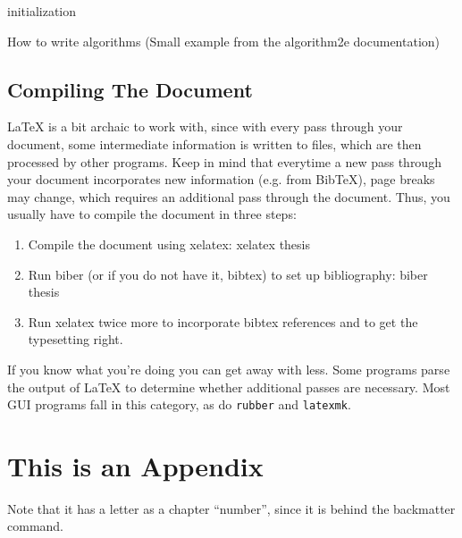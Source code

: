 \documentclass[12pt, %
a4paper, %
twoside, %
openright, %
abstract=on, %
DIV=11,      %
BCOR=8mm]{scrbook} %
\begin{document}
    \begin{algorithm}[t]
        \SetAlgoLined
        initialization\;
        \caption{How to write algorithms (Small example from the algorithm2e documentation)}
        \label{alg:exp}
    \end{algorithm}

    \section{Compiling The Document}
    \LaTeX{}  is  a bit  archaic  to  work  with,  since with  every  pass 
    through  your document,  some intermediate  information is  written to 
    files,  which are  then processed  by  other programs.   Keep in  mind 
    that  everytime a  new  pass through  your  document incorporates  new 
    information (e.g. from BibTeX), page breaks may change, which requires
    an  additional pass  through the  document. Thus, you  usually have  to
    compile the document in three steps:
    \begin{enumerate}
        \item Compile the document using xelatex: xelatex thesis
        \item Run biber  (or if  you do  not have  it, bibtex)  to set  up
              bibliography: biber thesis
        \item Run xelatex  twice more to incorporate  bibtex references and
              to get the typesetting right.
    \end{enumerate}

    If  you know  what  you're doing  you  can get  away  with less.   Some
    programs parse the  output of \LaTeX{} to  determine whether additional
    passes are necessary.  Most GUI programs fall in this category, as do
    \verb+rubber+ and \verb+latexmk+.

    \backmatter

    \chapter{This is an Appendix}
    Note that it has  a letter as a chapter ``number'',  since it is behind
    the backmatter command.

    \FloatBarrier

    \begin{singlespacing}
        \printbibliography
    \end{singlespacing}
\end{document}
